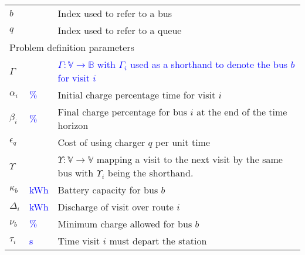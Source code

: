 \documentclass[utf8]{FrontiersinHarvard}
\begin{document}
\begin{table}[!htpb]
\begin{tabularx}{\textwidth}{l l l}
    $b$                      &                         & Index used to refer to a bus                                                                                      \\
    $q$                      &                         & Index used to refer to a queue                                                                                    \\
    \hline \multicolumn{3}{l}{Problem definition parameters}                                                                                                               \\
    \hline $\Gamma$               &                         & \textcolor{blue}{$\Gamma: \mathbb{V} \rightarrow \mathbb{B}$ with $\Gamma_i$ used as a shorthand to denote the bus $b$ for visit $i$} \\
    $\alpha_i$                    & \textcolor{blue}{$\%$}  & Initial charge percentage time for visit $i$                                                                      \\
    $\beta_i$                    & \textcolor{blue}{$\%$}  & Final charge percentage for bus $i$ at the end of the time horizon                                                \\
    $\epsilon_q$                    &                         & Cost of using charger $q$ per unit time                                                                           \\
    $\Upsilon$                      &                         & $\Upsilon: \mathbb{V} \rightarrow \mathbb{V}$ mapping a visit to the
    next visit by the same bus with $\Upsilon_i$ being the shorthand.                                                                                                             \\
    $\kappa_b$                    & \textcolor{blue}{kWh}   & Battery capacity for bus $b$                                                                                      \\
    $\Delta_i$                    & \textcolor{blue}{kWh}   & Discharge of visit over route $i$                                                                                 \\
    $\nu_b$                    & \textcolor{blue}{$\%$}  & Minimum charge allowed for bus $b$                                                                                \\
    $\tau_i$                    & \textcolor{blue}{s}     & Time visit $i$ must depart the station                                                                            \\

\end{tabularx}
\end{table}
\end{document}
